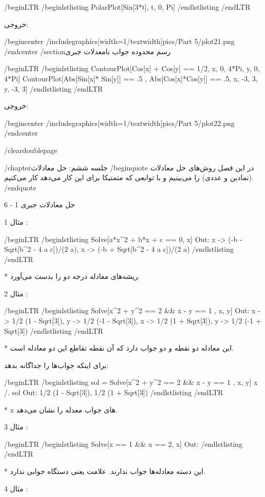 /begin{LTR}
/begin{lstlisting}
PolarPlot[Sin[3*t], {t, 0, Pi}]
/end{lstlisting}
/end{LTR}

خروجی:

/begin{center}
/includegraphics[width=1/textwidth]{pics/Part 5/plot21.png}
/end{center}
/section{رسم محدوده جواب نامعدلات جبری}

/begin{LTR}
/begin{lstlisting}
ContourPlot[Cos[x] + Cos[y] == 1/2, {x, 0, 4*Pi}, {y, 0, 4*Pi}]
ContourPlot[{Abs[Sin[x]* Sin[y]] == .5 , 
  Abs[Cos[x]*Cos[y]] == .5}, {x, -3, 3}, {y, -3, 3}]
/end{lstlisting}
/end{LTR}

خروجی:

/begin{center}
/includegraphics[width=1/textwidth]{pics/Part 5/plot22.png}
/end{center}

/cleardoublepage

/chapter{جلسه ششم: حل معادلات}
/begin{quote}
در این فصل روش‌های حل معادلات (نمادین و عددی) را می‌بینیم و با توابعی که متمتیکا برای این کار می‌دهد کار می‌کنیم.
/end{quote}

6 - 1 حل معادلات جبری

مثال 1 :

/begin{LTR}
/begin{lstlisting}
Solve[a*x^2 + b*x + c == 0, x]         Out: {{x -> (-b - Sqrt[b^2 - 4 a c])/(2 a)}, {x -> (-b + Sqrt[b^2 - 4 a c])/(2 a)}}
/end{lstlisting}
/end{LTR}

* ریشه‌های معادله درجه دو را بدست می‌آورد.

مثال 2 :

/begin{LTR}
/begin{lstlisting}
Solve[x^2 + y^2 == 2 && x - y == 1 , {x, y}]         
Out: {{x -> 1/2 (1 - Sqrt[3]), 
  y -> 1/2 (-1 - Sqrt[3])}, {x -> 1/2 (1 + Sqrt[3]), 
  y -> 1/2 (-1 + Sqrt[3])}}
/end{lstlisting}
/end{LTR}

* این معادله دو نقطه و دو جواب دارد که آن نقطه تقاطع این دو معادله است.

برای اینکه جواب‌ها را جداگانه بدهد:

/begin{LTR}
/begin{lstlisting}
sol = Solve[x^2 + y^2 == 2 && x - y == 1 , {x, y}] 
x /. sol            Out: {1/2 (1 - Sqrt[3]), 1/2 (1 + Sqrt[3])} 
/end{lstlisting}
/end{LTR}

* x های جواب معدله را نشان می‌دهد.

مثال 3 :

/begin{LTR}
/begin{lstlisting}
Solve[x == 1 && x == 2, x]          Out: {}
/end{lstlisting}
/end{LTR}

* این دسته معادله‌ها جواب ندارند. علامت {} یعنی دستگاه جوابی ندارد.

مثال 4 :

